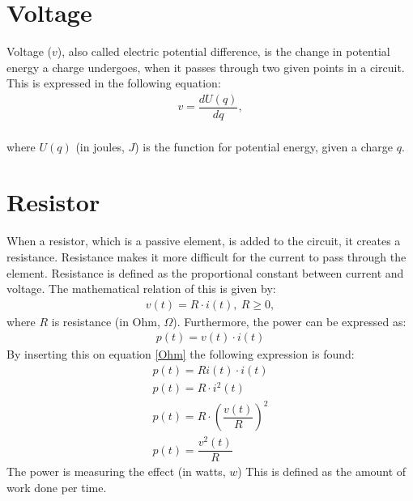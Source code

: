 \section{Voltage}
Voltage ($v$), also called electric potential difference, is the change in potential energy a charge undergoes, when it passes through two given points in a circuit. This is expressed in the following equation:
\begin{align}
	v=\dfrac{dU(q)}{dq},
\end{align}
\\
where $U(q)$ (in joules, $J$) is the function for potential energy, given a charge $q$.
\section{Resistor}
When a resistor, which is a passive element, is added to the circuit, it creates a resistance. Resistance makes it more difficult for the current to pass through the element. Resistance is defined as the proportional constant between current and voltage. The mathematical relation of this is given by:
\begin{align} 
\label{Ohm}
v(t)=R\cdot i(t),\ R\geq0,
\end{align}
where $R$ is resistance (in Ohm, $\Omega$). Furthermore, the power can be expressed as: \cite[p. 25]{bcircuit} 
\begin{align} 
\label{power}
p(t)=v(t)\cdot i(t)
\end{align}
By inserting this on equation \eqref{Ohm} the following expression is found:
\begin{align}
p(t)=Ri(t)\cdot i(t) \\
p(t)=R \cdot i^2(t) \\
p(t)=R \cdot \left(\dfrac{v(t)}{R} \right)^2 \\
p(t)=\dfrac{v^2(t)}{R} \label{resistor:power}
\end{align}
The power is measuring the effect (in watts, $w$) This is defined as the amount of work done per time. 
